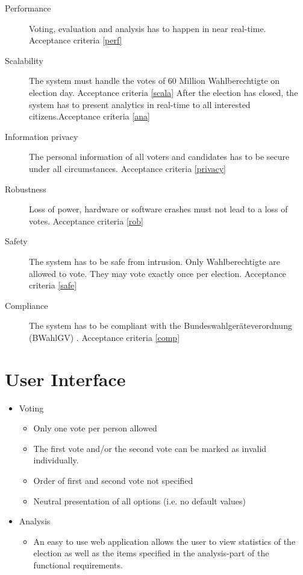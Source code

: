 \documentclass[10pt,a4paper]{article}
\begin{document}
	\begin{description}
		\item[Performance] Voting, evaluation and analysis has to happen in near real-time. Acceptance criteria \ref{perf}
		\item[Scalability] The system must handle the votes of 60 Million Wahlberechtigte on election day. Acceptance criteria \ref{scala}
		After the election has closed, the system has to present analytics in real-time to all interested citizens.Acceptance criteria \ref{ana}
		\item[Information privacy] The personal information of all voters and candidates has to be secure under all circumstances. Acceptance criteria \ref{privacy}
		\item[Robustness] Loss of power, hardware or software crashes must not lead to a loss of votes. Acceptance criteria \ref{rob}
		\item[Safety] The system has to be safe from intrusion. Only Wahlberechtigte are allowed to vote. They may vote exactly once per election. Acceptance criteria \ref{safe}
		\item[Compliance] The system has to be compliant with the Bundeswahlger\"ateverordnung (BWahlGV) . Acceptance criteria \ref{comp}
	\end{description}
	
	\section*{User Interface}
	
	\begin{itemize}
		\item Voting
			\begin{itemize}
				\item Only one vote per person allowed
				\item The first vote and/or the second vote can be marked as invalid individually.
				\item Order of first and second vote not specified
				\item Neutral presentation of all options (i.e. no default values)
			\end{itemize}
		\item Analysis
			\begin{itemize}
				\item An easy to use web application allows the user to view statistics of the election as well as the items specified in the analysis-part of the functional requirements.
			\end{itemize}
	\end{itemize}
	
\end{document}
